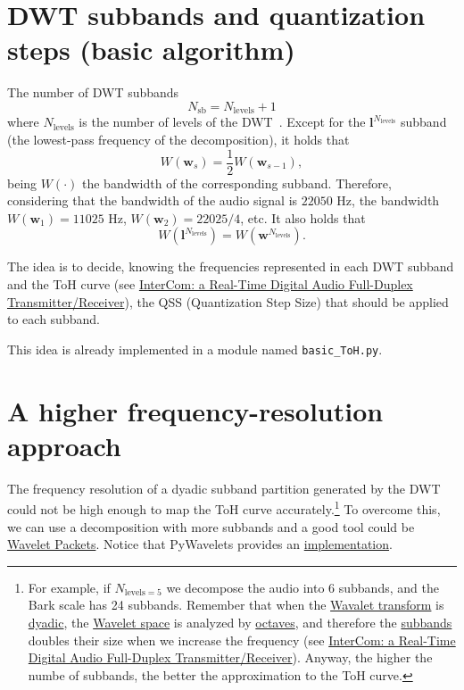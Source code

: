 \section{DWT subbands and quantization steps (basic algorithm)}
The number of DWT subbands
\begin{equation}
  N_{\text{sb}} = N_{\text{levels}} + 1
\end{equation}
where $N_{\text{levels}}$ is the number of levels of the
DWT~\cite{vetterli1995wavelets}. Except for the
${\mathbf l}^{N_{\text{levels}}}$ subband (the lowest-pass frequency
of the decomposition), it holds that
\begin{equation}
  W({\mathbf w}_s) = \frac{1}{2}W({\mathbf w}_{s-1}),
\end{equation}
being $W(\cdot)$ the bandwidth of the corresponding
subband. Therefore, considering that the bandwidth of the audio signal
is $22050$ Hz, the bandwidth $W({\mathbf w}_1)=11025$ Hz,
$W({\mathbf w}_2)=22025/4$, etc. It also holds that
\begin{equation}
  W({\mathbf l}^{N_{\text{levels}}}) = W({\mathbf w}^{N_{\text{levels}}}).
\end{equation}

The idea is to decide, knowing the frequencies represented in each DWT
subband and the ToH curve (see
\href{https://github.com/Tecnologias-multimedia/InterCom/blob/master/docs/2-hours_seminar.ipynb}{
  InterCom: a Real-Time Digital Audio Full-Duplex
  Transmitter/Receiver}), the QSS (Quantization Step Size) that should
be applied to each subband.

This idea is already implemented in a module named \verb|basic_ToH.py|.

\section{A higher frequency-resolution approach}
\label{sec:more_subbands}

The frequency resolution of a dyadic subband partition generated by
the DWT could not be high enough to map the ToH curve
accurately.\footnote{For example, if $N_{\text{levels}=5}$ we
  decompose the audio into 6 subbands, and the Bark scale has 24
  subbands. Remember that when the
  \href{https://en.wikipedia.org/wiki/Wavelet_transform}{Wavalet
    transform} is
  \href{https://en.wikipedia.org/wiki/Dyadic_rational}{dyadic}, the
  \href{https://en.wikipedia.org/wiki/Discrete_wavelet_transform}{Wavelet
    space} is analyzed by
  \href{https://en.wikipedia.org/wiki/Octave_band}{octaves}, and
  therefore the
  \href{https://en.wikipedia.org/wiki/Filter_bank}{subbands} doubles
  their size when we increase the frequency (see \href{https://github.com/Tecnologias-multimedia/InterCom/blob/master/docs/2-hours_seminar.ipynb}{
  InterCom: a Real-Time Digital Audio Full-Duplex
  Transmitter/Receiver}). Anyway, the higher the numbe of subbands, the better the
  approximation to the ToH curve.} To overcome this, we can use a
decomposition with more subbands and a good tool could be
\href{https://en.wikipedia.org/wiki/Wavelet_packet_decomposition}{Wavelet
  Packets}. Notice that PyWavelets provides an
\href{https://pywavelets.readthedocs.io/en/latest/ref/wavelet-packets.html}{implementation}.

